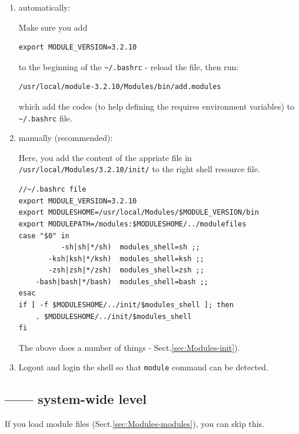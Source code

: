 \begin{enumerate}
  \item automatically:

Make sure you add 
\begin{verbatim}
export MODULE_VERSION=3.2.10
\end{verbatim}
to the beginning of the \verb!~/.bashrc! - reload the file, then run:
\begin{verbatim}
/usr/local/module-3.2.10/Modules/bin/add.modules
\end{verbatim}
which add the codes (to help defining the requires environment variables) to
\verb!~/.bashrc! file.

  \item manually (recommended):

Here, you add the content of the appriate file  in
\verb!/usr/local/Modules/3.2.10/init/! to the right shell resource file.  

\begin{verbatim}
//~/.bashrc file
export MODULE_VERSION=3.2.10
export MODULESHOME=/usr/local/Modules/$MODULE_VERSION/bin
export MODULEPATH=/modules:$MODULESHOME/../modulefiles
case "$0" in
          -sh|sh|*/sh)	modules_shell=sh ;;
       -ksh|ksh|*/ksh)	modules_shell=ksh ;;
       -zsh|zsh|*/zsh)	modules_shell=zsh ;;
    -bash|bash|*/bash)	modules_shell=bash ;;
esac
if [ -f $MODULESHOME/../init/$modules_shell ]; then
    . $MODULESHOME/../init/$modules_shell
fi
\end{verbatim}
  
The above does a number of things - Sect.\ref{sec:Modules-init}). 

 \item Logout and login the shell so that \verb!module! command can be detected.
\end{enumerate}


\subsection{------ system-wide level}

If you load module files (Sect.\ref{sec:Modules-modules}), you can
skip this. 
 


